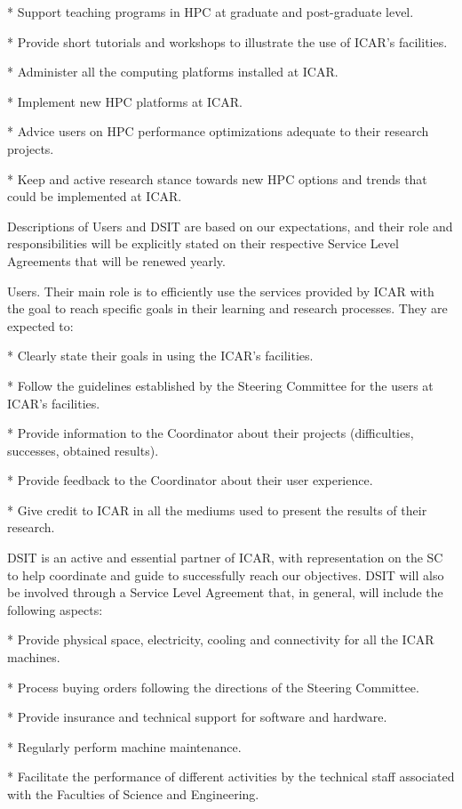 \documentclass{article}
\begin{document}
* Support teaching programs in HPC at graduate and post-graduate level.

* Provide short tutorials and workshops to illustrate the use of ICAR’s facilities.

* Administer all the computing platforms installed at ICAR.

* Implement new HPC platforms at ICAR.

* Advice users on HPC performance optimizations adequate to their research projects.

* Keep and active research stance towards new HPC options and trends that could be implemented at ICAR.

Descriptions of Users and DSIT are based on our expectations, and their role and responsibilities will be explicitly stated on their respective Service Level Agreements that will be renewed yearly.

Users. Their main role is to efficiently use the services provided by ICAR with the goal to reach specific goals in their learning and research processes. They are expected to:

* Clearly state their goals in using the ICAR’s facilities.

* Follow the guidelines established by the Steering Committee for the users at ICAR’s facilities.

* Provide information to the Coordinator about their projects (difficulties, successes, obtained results).

* Provide feedback to the Coordinator about their user experience.

* Give credit to ICAR in all the mediums used to present the results of their research.

DSIT is an active and essential partner of ICAR, with representation on the SC to help coordinate and guide to successfully reach our objectives. DSIT will also be involved through a Service Level Agreement that, in general, will include the following aspects:

* Provide physical space, electricity, cooling and connectivity for all the ICAR machines.

* Process buying orders following the directions of the Steering Committee.

* Provide insurance and technical support for software and hardware.

* Regularly perform machine maintenance.

* Facilitate the performance of different activities by the technical staff associated with the Faculties of Science and Engineering.
\end{document}
